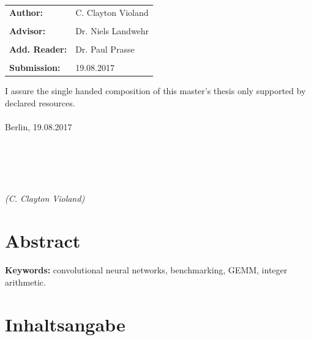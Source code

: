 \documentclass[12pt]{report}
\begin{document}
\vfill

\begin{tabular}{ll}
{\Large \bf Author:} & {\Large C. Clayton Violand} \\\\
{\Large \bf Advisor:} & {\Large Dr. Niels Landwehr} \\\\
{\Large \bf Add. Reader:} & {\Large Dr. Paul Prasse} \\\\
{\Large \bf Submission:} & {\Large 19.08.2017}
\end{tabular}

\newpage	
\thispagestyle{empty}
\hoffset=0mm
\vspace*{\fill}
\noindent I assure the single handed composition of this master's thesis only supported by declared resources.\\\\
Berlin, 19.08.2017\\\\\\\\\\\\
\noindent \textit{(C. Clayton Violand)}

\newpage
\thispagestyle{empty}
\null

\newpage
\thispagestyle{empty}
\hoffset=0mm
\section*{Abstract}	
\begin{spacing}{1.2}

\end{spacing}

\bigskip
\providecommand{\keywords}[1]{\textbf{Keywords:} #1}
\keywords{convolutional neural networks, benchmarking, GEMM, integer arithmetic.}

\section*{Inhaltsangabe}
\begin{spacing}{1.2}

\end{spacing}

\newpage
\hoffset=0mm
\setcounter{tocdepth}{3}
\setcounter{secnumdepth}{3}
\fboxsep 0mm

\newpage
\setlength{\baselineskip}{3ex}

\setcounter{page}{1}
\tableofcontents
\end{document}
